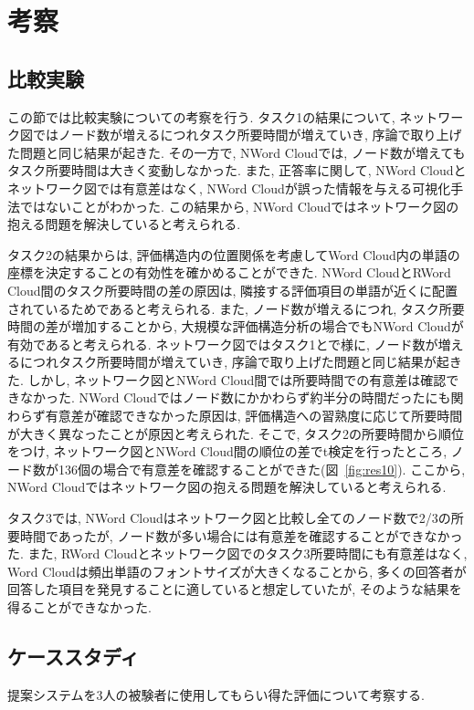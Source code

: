 \documentclass[syuuron]{kuee}
\begin{document}
\chapter{考察}
	\section{比較実験}
	この節では比較実験についての考察を行う. 
	タスク1の結果について, ネットワーク図ではノード数が増えるにつれタスク所要時間が増えていき, 序論で取り上げた問題と同じ結果が起きた. 
	その一方で, NWord Cloudでは, ノード数が増えてもタスク所要時間は大きく変動しなかった. 
	また, 正答率に関して, NWord Cloudとネットワーク図では有意差はなく, NWord Cloudが誤った情報を与える可視化手法ではないことがわかった. 
	この結果から, NWord Cloudではネットワーク図の抱える問題を解決していると考えられる. 
	
	タスク2の結果からは, 評価構造内の位置関係を考慮してWord Cloud内の単語の座標を決定することの有効性を確かめることができた. 
	NWord CloudとRWord Cloud間のタスク所要時間の差の原因は, 隣接する評価項目の単語が近くに配置されているためであると考えられる. 
	また, ノード数が増えるにつれ, タスク所要時間の差が増加することから, 大規模な評価構造分析の場合でもNWord Cloudが有効であると考えられる. 
	ネットワーク図ではタスク1とで様に, ノード数が増えるにつれタスク所要時間が増えていき, 序論で取り上げた問題と同じ結果が起きた. 
	しかし, ネットワーク図とNWord Cloud間では所要時間での有意差は確認できなかった. 
	NWord Cloudではノード数にかかわらず約半分の時間だったにも関わらず有意差が確認できなかった原因は, 
	評価構造への習熟度に応じて所要時間が大きく異なったことが原因と考えられた. 
	そこで, タスク2の所要時間から順位をつけ, ネットワーク図とNWord Cloud間の順位の差でt検定を行ったところ, 
	ノード数が136個の場合で有意差を確認することができた(図~\ref{fig:res10}). 
	ここから, NWord Cloudではネットワーク図の抱える問題を解決していると考えられる. 
	
	タスク3では, NWord Cloudはネットワーク図と比較し全てのノード数で2/3の所要時間であったが, ノード数が多い場合には有意差を確認することができなかった. 
	また, RWord Cloudとネットワーク図でのタスク3所要時間にも有意差はなく, 
	Word Cloudは頻出単語のフォントサイズが大きくなることから, 多くの回答者が回答した項目を発見することに適していると想定していたが, そのような結果を得ることができなかった. 
	
	\section{ケーススタディ}%
	提案システムを3人の被験者に使用してもらい得た評価について考察する. 
\end{document}
